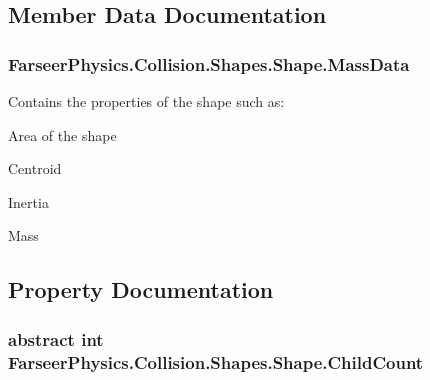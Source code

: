 \subsection{Member Data Documentation}
\hypertarget{class_farseer_physics_1_1_collision_1_1_shapes_1_1_shape_a744a8bbfbf07d2333ed9db28435ca6e4}{
\subsubsection[{Mass\+Data}]{ Farseer\+Physics.\+Collision.\+Shapes.\+Shape.\+Mass\+Data}}\label{class_farseer_physics_1_1_collision_1_1_shapes_1_1_shape_a744a8bbfbf07d2333ed9db28435ca6e4}


Contains the properties of the shape such as\+: 


\begin{DoxyItemize}
\item Area of the shape
\item Centroid
\item Inertia
\item Mass 
\end{DoxyItemize}

\subsection{Property Documentation}
\hypertarget{class_farseer_physics_1_1_collision_1_1_shapes_1_1_shape_ab75c1a7dfb7c16017b8e3d4b0daf3d53}{
\subsubsection[{Child\+Count}]{\setlength{\rightskip}{0pt plus 5cm}abstract int Farseer\+Physics.\+Collision.\+Shapes.\+Shape.\+Child\+Count\hspace{0.3cm}{\ttfamily [get]}}}\label{class_farseer_physics_1_1_collision_1_1_shapes_1_1_shape_ab75c1a7dfb7c16017b8e3d4b0daf3d53}


